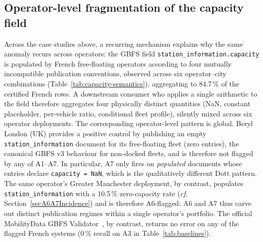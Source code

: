 \documentclass[11pt,a4paper]{article}
\begin{document}
\subsection{Operator-level fragmentation of the capacity field}
Across the case studies above, a recurring mechanism explains why
the same anomaly recurs across operators: the GBFS field
\texttt{station\_information.capacity} is populated by French
free-floating operators according to four mutually incompatible
publication conventions, observed across six operator--city
combinations (Table~\ref{tab:capacity-semantics}), aggregating to
84.7\,\% of the certified French rows. A downstream
consumer who applies a single arithmetic to the field therefore
aggregates four physically distinct quantities (NaN, constant
placeholder, per-vehicle ratio, conditional fleet profile),
silently mixed across six operator deployments. The corresponding
operator-level pattern is global. Beryl London (UK) provides a
positive control by publishing an empty \texttt{station\_information}
document for its free-floating fleet (zero entries), the canonical
GBFS v3 behaviour for non-docked fleets, and is therefore not flagged
by any of A1--A7. In particular, A7 only fires on \emph{populated}
documents whose entries declare \texttt{capacity = NaN}, which is the
qualitatively different Dott pattern. The same operator's
Greater Manchester deployment, by contrast, populates
\texttt{station\_information} with a 10.5\,\% zero-capacity rate
(\emph{cf.} Section~\ref{secA6A7Incidence}) and is therefore
A6-flagged: A6 and A7 thus carve out distinct publication regimes
within a single operator's portfolio. The official MobilityData GBFS
Validator~\cite{MobilityData2024Validator}, by contrast, returns no
error on any of the flagged French systems (0\,\% recall on A3 in
Table~\ref{tab:baselines}).
\end{document}
